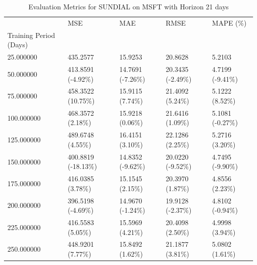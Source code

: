 \begin{table}
\caption{Evaluation Metrics for SUNDIAL on MSFT with Horizon 21 days}
\label{tab:sundial_MSFT_h21_metrics}
\begin{tabular}{lllll}
\toprule
 & MSE & MAE & RMSE & MAPE (\%) \\
Training Period (Days) &  &  &  &  \\
\midrule
25.000000 & 435.2577 & 15.9253 & 20.8628 & 5.2103 \\
50.000000 & 413.8591 (-4.92\%) & 14.7691 (-7.26\%) & 20.3435 (-2.49\%) & 4.7199 (-9.41\%) \\
75.000000 & 458.3522 (10.75\%) & 15.9115 (7.74\%) & 21.4092 (5.24\%) & 5.1222 (8.52\%) \\
100.000000 & 468.3572 (2.18\%) & 15.9218 (0.06\%) & 21.6416 (1.09\%) & 5.1081 (-0.27\%) \\
125.000000 & 489.6748 (4.55\%) & 16.4151 (3.10\%) & 22.1286 (2.25\%) & 5.2716 (3.20\%) \\
150.000000 & 400.8819 (-18.13\%) & 14.8352 (-9.62\%) & 20.0220 (-9.52\%) & 4.7495 (-9.90\%) \\
175.000000 & 416.0385 (3.78\%) & 15.1545 (2.15\%) & 20.3970 (1.87\%) & 4.8556 (2.23\%) \\
200.000000 & 396.5198 (-4.69\%) & 14.9670 (-1.24\%) & 19.9128 (-2.37\%) & 4.8102 (-0.94\%) \\
225.000000 & 416.5583 (5.05\%) & 15.5969 (4.21\%) & 20.4098 (2.50\%) & 4.9998 (3.94\%) \\
250.000000 & 448.9201 (7.77\%) & 15.8492 (1.62\%) & 21.1877 (3.81\%) & 5.0802 (1.61\%) \\
\bottomrule
\end{tabular}
\end{table}
